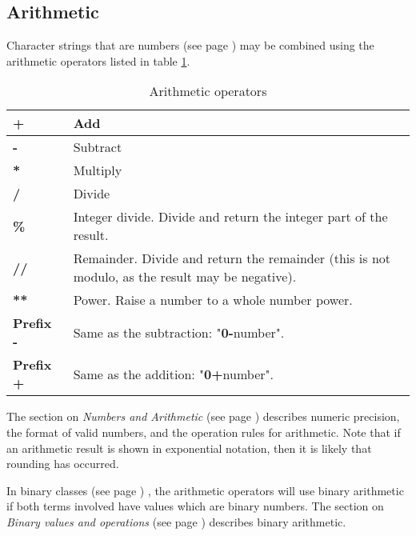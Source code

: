 \subsection{Arithmetic}
\index{,}
\index{,}
\index{,}
\index{,}
Character strings that are  numbers (see page \pageref{refnumdef}) 
may be combined using the arithmetic operators listed in table \ref{table:Arithmetic operators}.
\begin{table}\caption{Arithmetic operators}\label{table:Arithmetic operators}
\begin{tabularx}{\textwidth}{>{\bfseries}lX}
\toprule
+&Add
\\\midrule
-&Subtract
\\\midrule
*&Multiply
\\\midrule
/&Divide
\\\midrule
\%&Integer divide. Divide and return the integer part of the result.
\\\midrule
//&Remainder. Divide and return the remainder (this is not modulo, as the result
may be negative).
\\\midrule
**&Power. Raise a number to a whole number power.
\\\midrule
Prefix -&Same as the subtraction: "\textbf{0-}number".
\\\midrule
Prefix +&Same as the addition: "\textbf{0+}number".
\\\bottomrule
\end{tabularx}
\end{table}
The section on  \emph{Numbers and Arithmetic} (see page \pageref{refnums}) 
describes numeric precision, the format of valid numbers, and the
operation rules for arithmetic.  Note that if an arithmetic result is
shown in exponential notation, then it is likely that rounding has
occurred.
 
In  binary classes (see page \pageref{refbincla}) , the arithmetic operators will use
binary arithmetic if both terms involved have values which are binary
numbers.
The section on  \emph{Binary values and operations} (see page \pageref{refbinary}) 
describes binary arithmetic.
